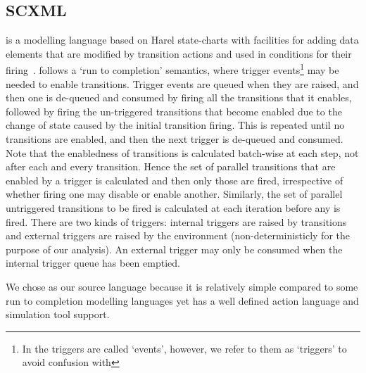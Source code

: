 
\subsection{SCXML}
\label{sec:scxml}

\SCXML is a modelling language based on Harel state-charts with facilities for adding data elements that are modified by transition actions and used in conditions for their firing~\cite{scxmlwebsite}. 
\SCXML follows a `run to completion' semantics, where trigger events\footnote{In \SCXML the triggers are called `events', however, we refer to them as `triggers' to avoid confusion with \EventB} may be needed to enable transitions.
Trigger events are queued when they are raised, and then one is de-queued and consumed by firing all the transitions that it enables, followed by firing the un-triggered transitions that become enabled due to the change of state caused by the initial transition firing.
This is repeated until no transitions are enabled, and then the next trigger is de-queued and consumed.
Note that the enabledness of transitions is calculated batch-wise at each step, not after each and every transition.
Hence the set of parallel transitions that are enabled by a trigger is calculated and then only those are fired, irrespective of whether firing one may disable or enable another.
Similarly, the set of parallel untriggered transitions to be fired is calculated at each iteration before any is fired.
There are two kinds of triggers: internal triggers are raised by transitions and external triggers are raised by the environment (non-deterministicly for the purpose of our analysis). 
An external trigger may only be consumed when the internal trigger queue has been emptied.

We chose \SCXML as our source language because it is relatively simple compared to some run to completion modelling languages yet has a well defined action language and simulation tool support.

